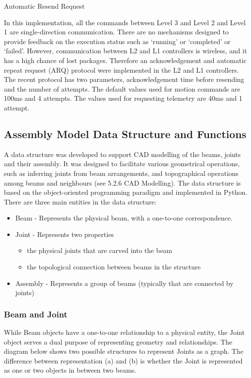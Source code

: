 Automatic Resend Request

In this implementation, all the commands between Level 3 and Level 2 and Level 1 are single-direction communication. There are no mechanisms designed to provide feedback on the execution status such as ‘running’ or ‘completed’ or ‘failed’. However, communication between L2 and L1 controllers is wireless, and it has a high chance of lost packages. Therefore an acknowledgement and automatic repeat request (ARQ) protocol were implemented in the L2 and L1 controllers. The recent protocol has two parameters, acknowledgement time before resending and the number of attempts. The default values used for motion commands are 100ms and 4 attempts. The values used for requesting telemetry are 40ms and 1 attempt. 

\subsection{Assembly Model Data Structure and Functions}
A data structure was developed to support CAD modelling of the beams, joints and their assembly. It was designed to facilitate various geometrical operations, such as inferring joints from beam arrangements, and topographical operations among beams and neighbours (see 5.2.6 CAD Modelling). The data structure is based on the object-oriented programming paradigm and implemented in Python. 
There are three main entities in the data structure:
\begin{itemize}
    \item Beam - Represents the physical beam, with a one-to-one correspondence.
    \item Joint - Represents two properties 
    \begin{itemize}
        \item the physical joints that are carved into the beam
        \item the topological connection between beams in the structure
    \end{itemize}
    \item Assembly - Represents a group of beams (typically that are connected by joints)
\end{itemize}

\subsubsection{Beam and Joint}
While Beam objects have a one-to-one relationship to a physical entity, the Joint object serves a dual purpose of representing geometry and relationships. The diagram below shows two possible structures to represent Joints as a graph. The difference between representation (a) and (b) is whether the Joint is represented as one or two objects in between two beams.

